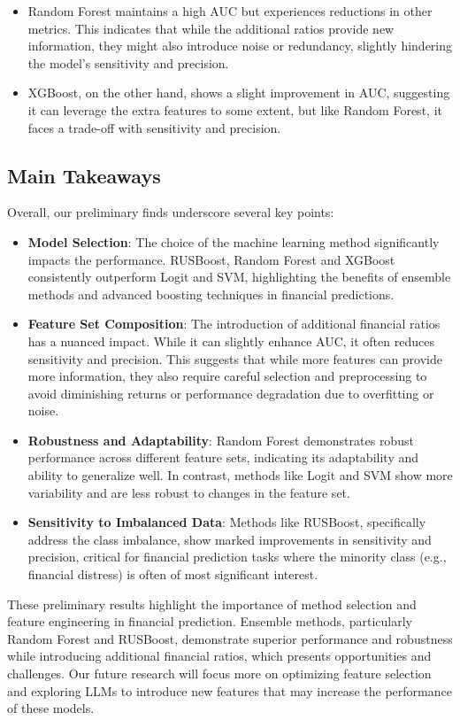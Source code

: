 \documentclass[conference]{IEEEtran}
\begin{document}
\begin{itemize}
\item Random Forest maintains a high AUC but experiences reductions in other metrics. This indicates that while the additional ratios provide new information, they might also introduce noise or redundancy, slightly hindering the model’s sensitivity and precision.
\item XGBoost, on the other hand, shows a slight improvement in AUC, suggesting it can leverage the extra features to some extent, but like Random Forest, it faces a trade-off with sensitivity and precision. \end{itemize}\subsection{Main Takeaways} Overall, our preliminary finds underscore several key points: \begin{itemize} 
\item \textbf{Model Selection}: The choice of the machine learning method significantly impacts the performance. RUSBoost, Random Forest and XGBoost consistently outperform Logit and SVM, highlighting the benefits of ensemble methods and advanced boosting techniques in financial predictions.
\item \textbf{Feature Set Composition}: The introduction of additional financial ratios has a nuanced impact. While it can slightly enhance AUC, it often reduces sensitivity and precision. This suggests that while more features can provide more information, they also require careful selection and preprocessing to avoid diminishing returns or performance degradation due to overfitting or noise.
\item \textbf{Robustness and Adaptability}: Random Forest demonstrates robust performance across different feature sets, indicating its adaptability and ability to generalize well. In contrast, methods like Logit and SVM show more variability and are less robust to changes in the feature set.
\item \textbf{Sensitivity to Imbalanced Data}: Methods like RUSBoost, specifically address the class imbalance, show marked improvements in sensitivity and precision, critical for financial prediction tasks where the minority class (e.g., financial distress) is often of most significant interest.
 \end{itemize} These preliminary results highlight the importance of method selection and feature engineering in financial prediction. Ensemble methods, particularly Random Forest and RUSBoost, demonstrate superior performance and robustness while introducing additional financial ratios, which presents opportunities and challenges. Our future research will focus more on optimizing feature selection and exploring LLMs to introduce new features that may increase the performance of these models. 
\end{document}
